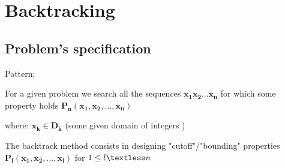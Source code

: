 \chapter{Backtracking}
\section{Problem's specification}

Pattern:

For a given problem we search all the sequences  $\bm{x_{1}x_{2} ... x_{n}}$ for which some property holds
 $\bm{P_n(x_{1},x_{2}, ..., x_{n})}$

\bigskip where: $\bm{x_k \in D_k}$ (some given domain of integers )

The backtrack method consists in designing "cutoff"/"bounding" properties $\bm{P_l(x_{1},x_{2}, ..., x_{l})}$ for $1\leq l \textless n$ 